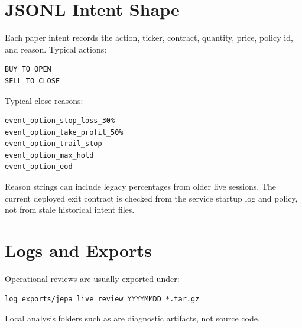 \documentclass[11pt,a4paper]{article}
\begin{document}
\section{JSONL Intent Shape}

Each paper intent records the action, ticker, contract, quantity, price, policy id, and reason. Typical actions:

\begin{lstlisting}
BUY_TO_OPEN
SELL_TO_CLOSE
\end{lstlisting}

Typical close reasons:

\begin{lstlisting}
event_option_stop_loss_30%
event_option_take_profit_50%
event_option_trail_stop
event_option_max_hold
event_option_eod
\end{lstlisting}

Reason strings can include legacy percentages from older live sessions. The current deployed exit contract is checked from the service startup log and policy, not from stale historical intent files.

\section{Logs and Exports}

Operational reviews are usually exported under:

\begin{lstlisting}
log_exports/jepa_live_review_YYYYMMDD_*.tar.gz
\end{lstlisting}

Local analysis folders such as  are diagnostic artifacts, not source code.
\end{document}
